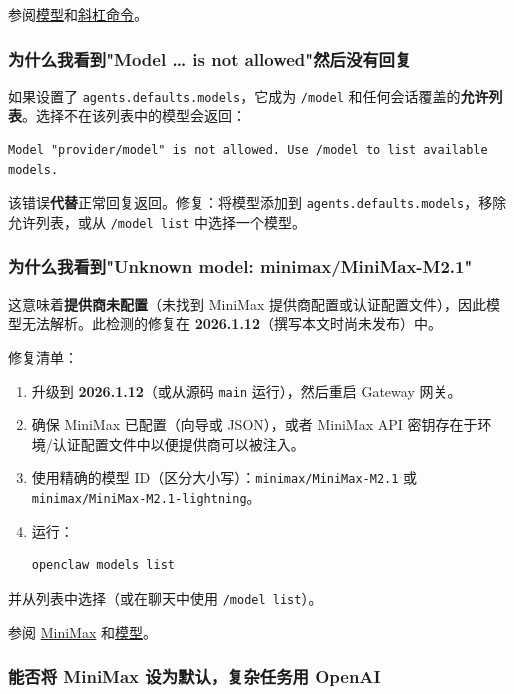 参阅\href{/concepts/models}{模型}和\href{/tools/slash-commands}{斜杠命令}。

\subsubsection{为什么我看到"Model … is not allowed"然后没有回复}


如果设置了 \texttt{agents.defaults.models}，它成为 \texttt{/model} 和任何会话覆盖的\textbf{允许列表}。选择不在该列表中的模型会返回：

\begin{lstlisting}
Model "provider/model" is not allowed. Use /model to list available models.
\end{lstlisting}


该错误\textbf{代替}正常回复返回。修复：将模型添加到 \texttt{agents.defaults.models}，移除允许列表，或从 \texttt{/model list} 中选择一个模型。

\subsubsection{为什么我看到"Unknown model: minimax/MiniMax-M2.1"}


这意味着\textbf{提供商未配置}（未找到 MiniMax 提供商配置或认证配置文件），因此模型无法解析。此检测的修复在 \textbf{2026.1.12}（撰写本文时尚未发布）中。

修复清单：

\begin{enumerate}
  \item 升级到 \textbf{2026.1.12}（或从源码 \texttt{main} 运行），然后重启 Gateway 网关。
  \item 确保 MiniMax 已配置（向导或 JSON），或者 MiniMax API 密钥存在于环境/认证配置文件中以便提供商可以被注入。
  \item 使用精确的模型 ID（区分大小写）：\texttt{minimax/MiniMax-M2.1} 或 \texttt{minimax/MiniMax-M2.1-lightning}。
  \item 运行：
\begin{lstlisting}[language=bash]
   openclaw models list
\end{lstlisting}

\end{enumerate}

并从列表中选择（或在聊天中使用 \texttt{/model list}）。

参阅 \href{/providers/minimax}{MiniMax} 和\href{/concepts/models}{模型}。

\subsubsection{能否将 MiniMax 设为默认，复杂任务用 OpenAI}


